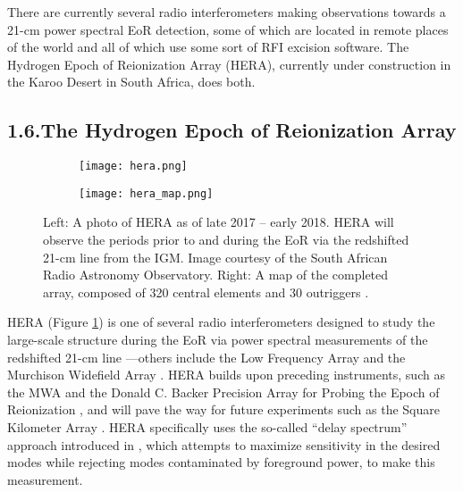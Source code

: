 \documentclass[12pt]{article}
\begin{document}
There are currently several radio interferometers making observations towards a 21-cm power spectral EoR detection, some of which are located in remote places of the world and all of which use some sort of RFI excision software. The Hydrogen Epoch of Reionization Array (HERA), currently under construction in the Karoo Desert in South Africa, does both. \vspace{3mm}

\tocless\subsection{\hypertarget{subsec:hera}{1.6.\hspace{0.75em}The Hydrogen Epoch of Reionization Array}}

\begin{figure}[tb]
	\centering
	\begin{subfigure}{0.48\textwidth}
		\centering
		{\texttt{[image: hera.png]}}
	\end{subfigure} \hfill
	\begin{subfigure}{0.48\textwidth}
		\centering
		{\texttt{[image: hera\_map.png]}}
	\end{subfigure}
	\caption[The Hydrogen Epoch of Reionization Array]{Left: A photo of HERA as of late 2017 -- early 2018. HERA will observe the periods prior to and during the EoR via the redshifted 21-cm line from the IGM. Image courtesy of the South African Radio Astronomy Observatory. Right: A map of the completed array, composed of 320 central elements and 30 outriggers \citep{deboer2017}.}
	\label{fig:hera}
\end{figure}

HERA (Figure \ref{fig:hera}) is one of several radio interferometers designed to study the large-scale structure during the EoR via power spectral measurements of the redshifted 21-cm line \citep{deboer2017}---others include the Low Frequency Array \citep[LOFAR;][]{vanHaarlem2013} and the Murchison Widefield Array \citep[MWA;][]{tingay2013}. HERA builds upon preceding instruments, such as the MWA and the Donald C. Backer Precision Array for Probing the Epoch of Reionization \citep[PAPER;][]{parsons2010}, and will pave the way for future experiments such as the Square Kilometer Array \cite[SKA; e.g.,][]{mellema2013}. HERA specifically uses the so-called ``delay spectrum'' approach introduced in \cite{parsons2012}, which attempts to maximize sensitivity in the desired modes while rejecting modes contaminated by foreground power, to make this measurement.
\end{document}
